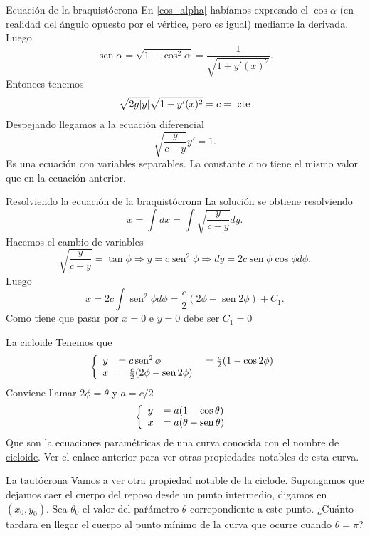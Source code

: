 \documentclass[handout,hyperref={colorlinks=true}]{beamer}
\DeclareMathOperator{\sen}{sen}
\begin{document}
\begin{frame}{Ecuación de la braquistócrona}
En \eqref{cos_alpha} habíamos expresado el $\cos\alpha$ (en realidad del ángulo opuesto por el vértice, pero es igual) mediante la derivada. Luego
\[\sen\alpha=\sqrt{1-\cos^2\alpha}=\frac{1}{\sqrt{1+y'(x)^2}}.\]
Entonces tenemos
\[\sqrt{2g|y|}\sqrt{1+y'(x)^2}=c=\hbox{ cte}\]
Despejando llegamos a la ecuación diferencial
\[\boxed{\sqrt{\frac{y}{c-y}}y'=1}.\]
Es una ecuación con variables separables. La constante $c$ no tiene el mismo valor que en la ecuación anterior.  
  \end{frame}

  \begin{frame}{Resolviendo la ecuación de la braquistócrona}
La solución se obtiene resolviendo
\[x=\int dx=\int \sqrt{\frac{y}{c-y}}dy.\]
Hacemos el cambio de variables
\[\sqrt{\frac{y}{c-y}}=\tan\phi\Longrightarrow y=c\sen^2\phi\Longrightarrow dy=2c\sen\phi\cos\phi d\phi.\]
Luego
\[x=2c\int\sen^2\phi d\phi=\frac{c}{2}\left(2\phi-\sen 2\phi\right)+C_1.\]
Como tiene que pasar por $x=0$ e $y=0$ debe ser $C_1=0$

  \end{frame}

  \begin{frame}{La cicloide}
 Tenemos que
 \[\left\{\begin{array}{l l l}
	      y&=c\sen^2 \phi&=\frac{c}{2}(1-\cos2\phi)\\
	      x&=\frac{c}{2}(2\phi-\sen2\phi)\ &\\
          \end{array}\right.
\]
Conviene llamar $2\phi=\theta$ y $a=c/2$
 \[\left\{\begin{array}{l l }
	      y&= a(1-\cos\theta)\\
	      x&=a(\theta-\sen\theta)\
          \end{array}\right.
\]
Que son la ecuaciones paramétricas de una curva conocida con el nombre de \href{http://es.wikipedia.org/wiki/Cicloide}{cicloide}. Ver el enlace anterior para ver 
otras propiedades notables de esta curva.
\begin{center}
\end{center}
  
  \end{frame}


  \begin{frame}{La tautócrona}
  Vamos a ver otra propiedad notable de la ciclode. Supongamos que dejamos caer el cuerpo del reposo desde un punto intermedio, digamos en $(x_0,y_0)$. Sea  $\theta_0$
 el valor del paŕámetro $\theta$ correpondiente a este punto. ¿Cuánto tardara en llegar el cuerpo al punto mínimo de la curva que ocurre cuando $\theta=\pi$? 
\begin{center}
\end{center}

  \end{frame}
  
\end{document}
